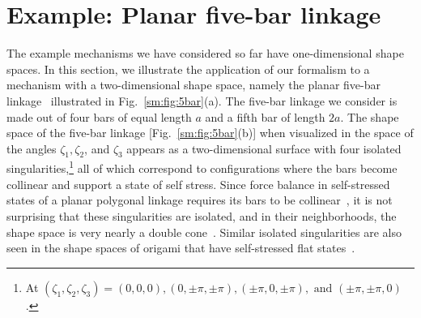 \section{Example: Planar five-bar linkage}
\label{sm:sec:5bar}

The example mechanisms we have considered so far have one-dimensional shape spaces.
In this section, we illustrate the application of our formalism to a mechanism with a two-dimensional shape space, namely the planar five-bar linkage~\cite{mermoud2000,curtis2007} illustrated in Fig.~\ref{sm:fig:5bar}(a).
The five-bar linkage we consider is made out of four bars of equal length $a$ and a fifth bar of length $2a$.
The shape space of the five-bar linkage [Fig.~\ref{sm:fig:5bar}(b)] when visualized in the space of the angles $\zeta_{1}, \zeta_{2}$, and $\zeta_{3}$ appears as a two-dimensional surface with four isolated singularities,\footnote{At $(\zeta_{1}, \zeta_{2}, \zeta_{3}) = (0, 0, 0), (0, \pm\pi, \pm\pi), (\pm\pi, 0, \pm\pi), \text{ and } (\pm\pi, \pm\pi, 0)$.} all of which correspond to configurations where the bars become collinear and support a state of self stress.
Since force balance in self-stressed states of a planar polygonal linkage requires its bars to be collinear~\cite{farber2008}, it is not surprising that these singularities are isolated, and in their neighborhoods, the shape space is very nearly a double cone~\cite{kapovich1995,mermoud2000}.
Similar isolated singularities are also seen in the shape spaces of origami that have self-stressed flat states~\cite{berry2020}.

